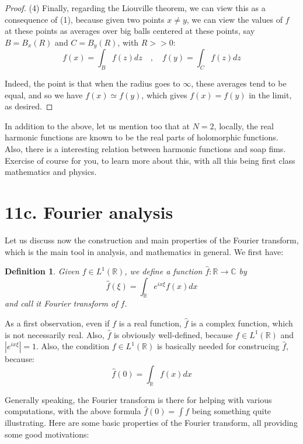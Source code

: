 \documentclass[12pt]{amsbook}
\newtheorem{definition}[theorem]{Definition}
\begin{document}
\begin{proof}
\medskip

(4) Finally, regarding the Liouville theorem, we can view this as a consequence of (1), because given two points $x\neq y$, we can view the values of $f$ at these points as averages over big balls centered at these points, say $B=B_x(R)$ and $C=B_y(R)$, with $R>>0$:
$$f(x)=\int_Bf(z)dz\quad,\quad f(y)=\int_Cf(z)dz$$

Indeed, the point is that when the radius goes to $\infty$, these averages tend to be equal, and so we have $f(x)\simeq f(y)$, which gives $f(x)=f(y)$ in the limit, as desired.
\end{proof}

In addition to the above, let us mention too that at $N=2$, locally, the real harmonic functions are known to be the real parts of holomorphic functions. Also, there is a interesting relation between harmonic functions and soap fims. Exercise of course for you, to learn more about this, with all this being first class mathematics and physics.

\section*{11c. Fourier analysis}

Let us discuss now the construction and main properties of the Fourier transform, which is the main tool in analysis, and mathematics in general. We first have:


\begin{definition}
Given $f\in L^1(\mathbb R)$, we define a function $\widehat{f}:\mathbb R\to\mathbb C$ by
$$\widehat{f}(\xi)=\int_\mathbb R e^{ix\xi}f(x)dx$$
and call it Fourier transform of $f$.
\end{definition}

As a first observation, even if $f$ is a real function, $\widehat{f}$ is a complex function, which is not necessarily real. Also, $\widehat{f}$ is obviously well-defined, because $f\in L^1(\mathbb R)$ and $|e^{ix\xi}|=1$. Also, the condition $f\in L^1(\mathbb R)$ is basically needed for construcing $\widehat{f}$, because:
$$\widehat{f}(0)=\int_\mathbb Rf(x)dx$$

Generally speaking, the Fourier transform is there for helping with various computations, with the above formula $\widehat{f}(0)=\int f$ being something quite illustrating. Here are some basic properties of the Fourier transform, all providing some good motivations:
\end{document}
